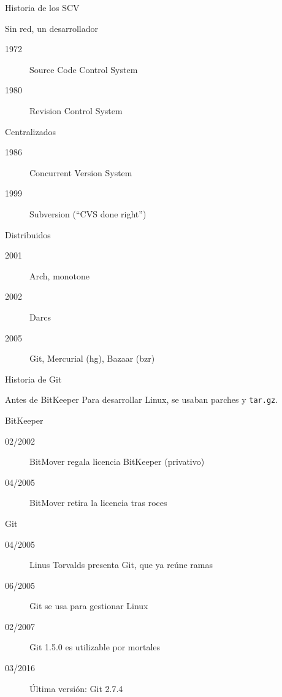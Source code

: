 \documentclass[xcolor=svgnames]{beamer}
\begin{document}
\begin{frame}{Historia de los SCV}

  \begin{block}{Sin red, un desarrollador}
    \begin{description}
    \item[1972] Source Code Control System
    \item[1980] Revision Control System
    \end{description}
  \end{block}

  \begin{block}{Centralizados}
    \begin{description}
    \item[1986] Concurrent Version System
    \item[1999] Subversion (\enquote{CVS done right})
    \end{description}
  \end{block}

  \begin{block}{Distribuidos}
    \begin{description}
    \item[2001] Arch, monotone
    \item[2002] Darcs
    \item[2005] Git, Mercurial (hg), Bazaar (bzr)
    \end{description}
  \end{block}

\end{frame}

\begin{frame}{Historia de Git}

  \begin{block}{Antes de BitKeeper}
    Para desarrollar Linux, se usaban parches y \texttt{tar.gz}.
  \end{block}

  \begin{block}{BitKeeper}
    \begin{description}
    \item[02/2002] BitMover regala licencia BitKeeper (privativo)
    \item[04/2005] BitMover retira la licencia tras roces
    \end{description}
  \end{block}

  \begin{block}{Git}
    \begin{description}
    \item[04/2005] Linus Torvalds presenta Git, que ya reúne ramas
    \item[06/2005] Git se usa para gestionar Linux
    \item[02/2007] Git 1.5.0 es utilizable por mortales
    \item[03/2016] Última versión: Git 2.7.4
    \end{description}
  \end{block}

\end{frame}
\end{document}
